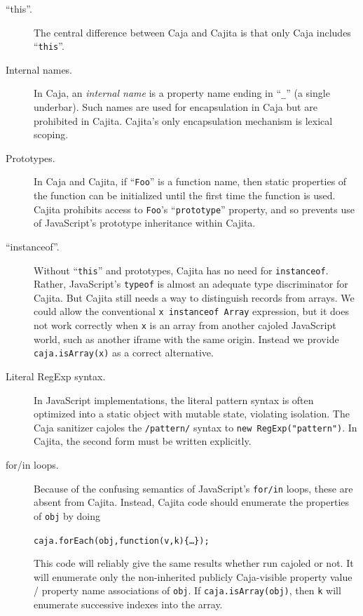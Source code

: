 \documentclass[letterpaper,twocolumn,10pt]{article}
\newcommand{\code}[1]{{\tt {#1}}}              %
\begin{document}
\begin{description}
    
    \item[``this''.] The central difference between Caja and Cajita is that only Caja includes ``\code{this}''.
    
    \item[Internal names.] In Caja, an \emph{internal name} is a property name ending in ``\code{\_}'' (a single 
    underbar). Such names are used for encapsulation in Caja but are prohibited in Cajita. Cajita's only 
    encapsulation mechanism is lexical scoping.
    
    \item[Prototypes.] In Caja and Cajita, if ``\code{Foo}'' is a function name, then static properties of the 
    function can be initialized until the first time the function is used. Cajita prohibits access to \code{Foo}'s 
    ``\code{prototype}'' property, and so prevents use of JavaScript's prototype inheritance within Cajita.
    
    \item[``instanceof''.] Without ``\code{this}'' and prototypes, Cajita has no need for \code{instanceof}. Rather, 
    JavaScript's \code{typeof} is almost an adequate type discriminator for Cajita. But Cajita still needs a way to 
    distinguish records from arrays. We could allow the conventional \code{x instanceof Array} expression, but it 
    does not work correctly when \code{x} is an array from another cajoled JavaScript world, such as another iframe 
    with the same origin. Instead we provide \code{caja.isArray(x)} as a correct alternative.
    
    \item[Literal RegExp syntax.] In JavaScript implementations, the literal pattern syntax is often optimized into a 
    static object with mutable state, violating isolation. The Caja sanitizer cajoles the \code{/pattern/} syntax to 
    \code{new RegExp("pattern")}. In Cajita, the second form must be written explicitly.
    
    \item[for/in loops.] Because of the confusing semantics of JavaScript's \code{for/in} loops, these are absent 
    from Cajita. Instead, Cajita code should enumerate the properties of \code{obj} by doing
%
\begin{alltt}caja.forEach(obj,function(v,k)\{{\ldots}\});\end{alltt}
%
    This code will reliably give the same results whether run cajoled or not. It will enumerate only the 
    non-inherited publicly Caja-visible property value / property name associations of \code{obj}. If 
    \code{caja.isArray(obj)}, then \code{k} will enumerate successive indexes into the array.
    

\end{description}
\end{document}
